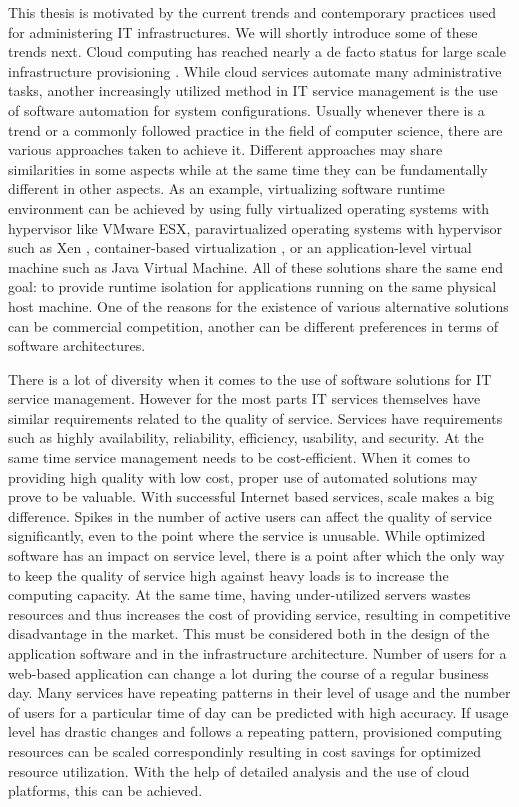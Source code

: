 This thesis is motivated by the current trends and contemporary practices used
for administering IT infrastructures. We will shortly introduce some of these
trends next. Cloud computing has reached nearly a de facto status for large
scale infrastructure provisioning \cite{armbrust2010view}. While cloud services
automate many administrative tasks, another increasingly utilized method in IT
service management is the use of software automation for system configurations.
Usually whenever there is a trend or a commonly followed practice in the field
of computer science, there are various approaches taken to achieve it.
Different approaches may share similarities in some aspects while at the same
time they can be fundamentally different in other aspects. As an example,
virtualizing software runtime environment can be achieved by using fully
virtualized operating systems with hypervisor like VMware ESX, paravirtualized
operating systems with hypervisor such as Xen \cite{barham2003xen},
container-based virtualization \cite{soltesz2007container-based}, or an
application-level virtual machine such as Java Virtual Machine. All of these
solutions share the same end goal: to provide runtime isolation for
applications running on the same physical host machine. One of the reasons for
the existence of various alternative solutions can be commercial competition,
another can be different preferences in terms of software architectures.

There is a lot of diversity when it comes to the use of software solutions for
IT service management. However for the most parts IT services themselves have
similar requirements related to the quality of service. Services have
requirements such as highly availability, reliability, efficiency, usability,
and security. At the same time service management needs to be cost-efficient.
When it comes to providing high quality with low cost, proper use of automated
solutions may prove to be valuable. With successful Internet based services,
scale makes a big difference. Spikes in the number of active users can affect
the quality of service significantly, even to the point where the service is
unusable. While optimized software has an impact on service level, there is a
point after which the only way to keep the quality of service high against
heavy loads is to increase the computing capacity. At the same time, having
under-utilized servers wastes resources and thus increases the cost of
providing service, resulting in competitive disadvantage in the market. This
must be considered both in the design of the application software and in the
infrastructure architecture. Number of users for a web-based application can
change a lot during the course of a regular business day. Many services have
repeating patterns in their level of usage and the number of users for a
particular time of day can be predicted with high accuracy. If usage level has
drastic changes and follows a repeating pattern, provisioned computing
resources can be scaled correspondinly resulting in cost savings for optimized
resource utilization. With the help of detailed analysis and the use of cloud
platforms, this can be achieved.

